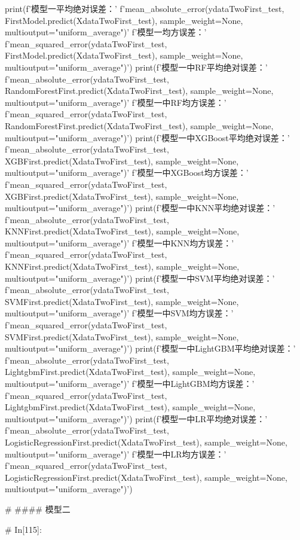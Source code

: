 \documentclass{MathorCupmodeling}
\begin{document}
\begin{python}
	
	print(f'模型一平均绝对误差：'
		  f'{mean_absolute_error(ydataTwoFirst_test, FirstModel.predict(XdataTwoFirst_test), sample_weight=None, multioutput="uniform_average")}\n'
		  f'模型一均方误差：'
		  f'{mean_squared_error(ydataTwoFirst_test, FirstModel.predict(XdataTwoFirst_test), sample_weight=None, multioutput="uniform_average")}')
	print(f'模型一中RF平均绝对误差：'
		  f'{mean_absolute_error(ydataTwoFirst_test, RandomForestFirst.predict(XdataTwoFirst_test), sample_weight=None, multioutput="uniform_average")}\n'
		  f'模型一中RF均方误差：'
		  f'{mean_squared_error(ydataTwoFirst_test, RandomForestFirst.predict(XdataTwoFirst_test), sample_weight=None, multioutput="uniform_average")}')
	print(f'模型一中XGBoost平均绝对误差：'
		  f'{mean_absolute_error(ydataTwoFirst_test, XGBFirst.predict(XdataTwoFirst_test), sample_weight=None, multioutput="uniform_average")}\n'
		  f'模型一中XGBoost均方误差：'
		  f'{mean_squared_error(ydataTwoFirst_test, XGBFirst.predict(XdataTwoFirst_test), sample_weight=None, multioutput="uniform_average")}')
	print(f'模型一中KNN平均绝对误差：'
		  f'{mean_absolute_error(ydataTwoFirst_test, KNNFirst.predict(XdataTwoFirst_test), sample_weight=None, multioutput="uniform_average")}\n'
		  f'模型一中KNN均方误差：'
		  f'{mean_squared_error(ydataTwoFirst_test, KNNFirst.predict(XdataTwoFirst_test), sample_weight=None, multioutput="uniform_average")}')
	print(f'模型一中SVM平均绝对误差：'
		  f'{mean_absolute_error(ydataTwoFirst_test, SVMFirst.predict(XdataTwoFirst_test), sample_weight=None, multioutput="uniform_average")}\n'
		  f'模型一中SVM均方误差：'
		  f'{mean_squared_error(ydataTwoFirst_test, SVMFirst.predict(XdataTwoFirst_test), sample_weight=None, multioutput="uniform_average")}')
	print(f'模型一中LightGBM平均绝对误差：'
		  f'{mean_absolute_error(ydataTwoFirst_test, LightgbmFirst.predict(XdataTwoFirst_test), sample_weight=None, multioutput="uniform_average")}\n'
		  f'模型一中LightGBM均方误差：'
		  f'{mean_squared_error(ydataTwoFirst_test, LightgbmFirst.predict(XdataTwoFirst_test), sample_weight=None, multioutput="uniform_average")}')
	print(f'模型一中LR平均绝对误差：'
		  f'{mean_absolute_error(ydataTwoFirst_test, LogisticRegressionFirst.predict(XdataTwoFirst_test), sample_weight=None, multioutput="uniform_average")}\n'
		  f'模型一中LR均方误差：'
		  f'{mean_squared_error(ydataTwoFirst_test, LogisticRegressionFirst.predict(XdataTwoFirst_test), sample_weight=None, multioutput="uniform_average")}')
	
	# #### 模型二
	
	# In[115]:
	

\end{python}
\end{document}
